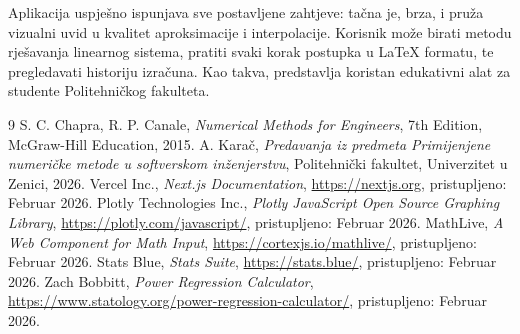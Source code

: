 \documentclass[12pt, a4paper]{article}
\begin{document}
Aplikacija uspješno ispunjava sve postavljene zahtjeve: tačna je, brza, i pruža vizualni uvid u kvalitet aproksimacije i interpolacije. Korisnik može birati metodu rješavanja linearnog sistema, pratiti svaki korak postupka u LaTeX formatu, te pregledavati historiju izračuna. Kao takva, predstavlja koristan edukativni alat za studente Politehničkog fakulteta.

\newpage

\begin{thebibliography}{9}  %
 S. C. Chapra, R. P. Canale, \textit{Numerical Methods for Engineers}, 7th Edition, McGraw-Hill Education, 2015.
 A. Karač, \textit{Predavanja iz predmeta Primijenjene numeričke metode u softverskom inženjerstvu}, Politehnički fakultet, Univerzitet u Zenici, 2026.
 Vercel Inc., \textit{Next.js Documentation}, \url{https://nextjs.org}, pristupljeno: Februar 2026.
 Plotly Technologies Inc., \textit{Plotly JavaScript Open Source Graphing Library}, \url{https://plotly.com/javascript/}, pristupljeno: Februar 2026.
 MathLive, \textit{A Web Component for Math Input}, \url{https://cortexjs.io/mathlive/}, pristupljeno: Februar 2026.
 Stats Blue, \textit{Stats Suite}, \url{https://stats.blue/}, pristupljeno: Februar 2026.
 Zach Bobbitt, \textit{Power Regression Calculator}, \url{https://www.statology.org/power-regression-calculator/}, pristupljeno: Februar 2026.

\end{thebibliography}
\end{document}
